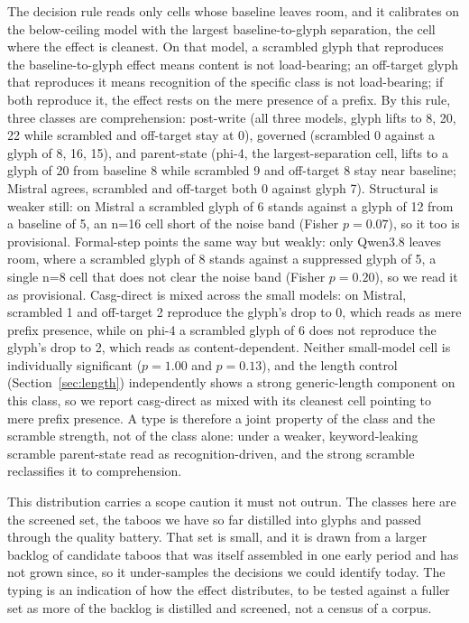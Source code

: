 \documentclass[11pt,a4paper]{article}
\begin{document}
The decision rule reads only cells whose baseline leaves room, and it calibrates on the
below-ceiling model with the largest baseline-to-glyph separation, the cell where the
effect is cleanest. On that model, a scrambled glyph that reproduces the baseline-to-glyph
effect means content is not load-bearing; an off-target glyph that reproduces it means
recognition of the specific class is not load-bearing; if both reproduce it, the effect
rests on the mere presence of a prefix. By this rule, three classes are comprehension:
post-write (all three models, glyph lifts to 8, 20, 22 while scrambled and off-target stay
at 0), governed (scrambled 0 against a glyph of 8, 16, 15), and parent-state (phi-4, the
largest-separation cell, lifts
to a glyph of 20 from baseline 8 while scrambled 9 and off-target 8 stay near baseline;
Mistral agrees, scrambled and off-target both 0 against glyph 7). Structural is weaker
still: on Mistral a scrambled glyph of 6 stands against a glyph of 12 from a
baseline of 5, an n=16 cell short of the noise band (Fisher $p = 0.07$), so it too is
provisional. Formal-step points the
same way but weakly:
only Qwen3.8 leaves room, where a scrambled glyph of 8 stands against a suppressed glyph of
5, a single n=8 cell that does not clear the noise band (Fisher $p = 0.20$), so we read it
as provisional. Casg-direct is mixed across the small models: on Mistral, scrambled 1 and
off-target 2 reproduce the glyph's drop to 0, which reads as mere prefix presence, while on
phi-4 a scrambled glyph of 6 does not reproduce the glyph's drop to 2, which reads as
content-dependent. Neither small-model cell is individually significant ($p = 1.00$ and
$p = 0.13$), and the length control (Section~\ref{sec:length}) independently shows a strong
generic-length component on this class, so we report casg-direct as mixed with its cleanest
cell pointing to mere prefix presence. A type is therefore a joint property of the class
and the scramble strength, not of the class alone: under a weaker, keyword-leaking scramble
parent-state read as recognition-driven, and the strong scramble reclassifies it to
comprehension.

This distribution carries a scope caution it must not outrun. The classes here are the
screened set, the taboos we have so far distilled into glyphs and passed through the
quality battery. That set is small, and it is drawn from a larger backlog of candidate
taboos that was itself assembled in one early period and has not grown since, so it
under-samples the decisions we could identify today. The typing is an indication of how
the effect distributes, to be tested against a fuller set as more of the backlog is
distilled and screened, not a census of a corpus.
\end{document}
